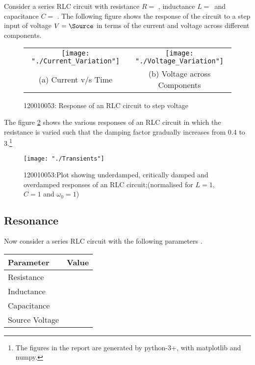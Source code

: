 \documentclass[12pt, twosides]{article}
\newcommand{\rollno}{120010053}
\newcommand{\voltage}{\ensuremath{V}}
\newcommand{\res}{R}
\newcommand{\capc}{C}
\newcommand{\ind}{L}
\begin{document}
			\noindent
			Consider a series RLC circuit with resistance \(\res =\) \Res, inductance \(\ind = \)\Ind \ and capacitance \(\capc = \) \Capc. The following figure shows the response of the circuit to a step input of voltage \(\voltage = \Source\) in terms of the current and voltage across different components.

			\begin{figure}[H]
			\centering
			\begin{tabular}{cc}
				\texttt{[image: "./Current\_Variation"]} &
				\texttt{[image: "./Voltage\_Variation"]} \\
				(a) Current v/s Time & (b) Voltage across Components
			\end{tabular}
			\caption{\rollno: Response of an RLC circuit to step voltage}
			\label{fig:step response}
			\end{figure}

			\noindent
			The figure \ref{fig:transients} shows the various responses of an RLC circuit in which the resistance is varied such that the damping factor gradually increases from 0.4 to 3.\footnote{The figures in the report are generated by python-3+, with matplotlib and numpy.}
			\begin{figure}[H]
			\centering
				\texttt{[image: "./Transients"]}
			\caption{\rollno:Plot showing underdamped, critically damped and overdamped responses of an RLC circuit;(normalised for \(\ind = 1\), \(\capc = 1\) and \(\omega_0 = 1\))}
			\label{fig:transients}
			\end{figure}
			
			
		\subsection{Resonance}	
			Now consider a series RLC circuit with the following parameters \cite{AllAbtCirc}.
			\begin{center}
			\begin{tabular}{|l|c|}
				\hline
				Parameter & Value\\ \hline
				Resistance & \serRes\\
				Inductance & \serInd\\
				Capacitance & \serCap\\
				Source Voltage & \serSource\\ \hline
			\end{tabular}
			\end{center}
		
\end{document}
